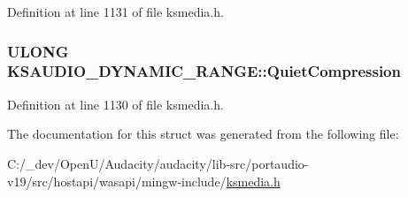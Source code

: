 Definition at line 1131 of file ksmedia.\+h.

\subsubsection[{\texorpdfstring{Quiet\+Compression}{QuietCompression}}]{\setlength{\rightskip}{0pt plus 5cm}U\+L\+O\+NG K\+S\+A\+U\+D\+I\+O\+\_\+\+D\+Y\+N\+A\+M\+I\+C\+\_\+\+R\+A\+N\+G\+E\+::\+Quiet\+Compression}\hypertarget{struct_k_s_a_u_d_i_o___d_y_n_a_m_i_c___r_a_n_g_e_a4f7620cb05453bf9f78226891fbe09a0}{}\label{struct_k_s_a_u_d_i_o___d_y_n_a_m_i_c___r_a_n_g_e_a4f7620cb05453bf9f78226891fbe09a0}


Definition at line 1130 of file ksmedia.\+h.



The documentation for this struct was generated from the following file\+:\begin{DoxyCompactItemize}
\item 
C\+:/\+\_\+dev/\+Open\+U/\+Audacity/audacity/lib-\/src/portaudio-\/v19/src/hostapi/wasapi/mingw-\/include/\hyperlink{ksmedia_8h}{ksmedia.\+h}\end{DoxyCompactItemize}
